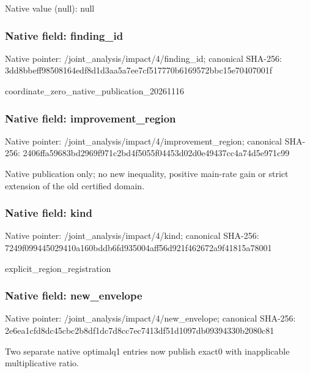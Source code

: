 \documentclass[10pt,a4paper]{article}
\begin{document}
Native value (null): null

\subsubsection{Native field: finding\_\allowbreak{}id}
Native pointer: /joint\_\allowbreak{}analysis/impact/4/finding\_\allowbreak{}id; canonical SHA-256: 3dd8bbeff98508164edf8d1d3aa5a7ee7cf517770b6169572bbc15e70407001f

\begingroup\raggedright\sloppy coordinate\_\allowbreak{}zero\_\allowbreak{}native\_\allowbreak{}publication\_\allowbreak{}20261116\par\endgroup

\subsubsection{Native field: improvement\_\allowbreak{}region}
Native pointer: /joint\_\allowbreak{}analysis/impact/4/improvement\_\allowbreak{}region; canonical SHA-256: 2406ffa59683bd2969f971c2bd4f5055f04453d02d0e49437cc4a74d5e971c99

\begingroup\raggedright\sloppy Native publication only;\allowbreak{} no new inequality,\allowbreak{} positive main-rate gain or strict extension of the old certified domain.\par\endgroup

\subsubsection{Native field: kind}
Native pointer: /joint\_\allowbreak{}analysis/impact/4/kind; canonical SHA-256: 7249f099445029410a160bddb6fd935004aff56d921f462672a9f41815a78001

\begingroup\raggedright\sloppy explicit\_\allowbreak{}region\_\allowbreak{}registration\par\endgroup

\subsubsection{Native field: new\_\allowbreak{}envelope}
Native pointer: /joint\_\allowbreak{}analysis/impact/4/new\_\allowbreak{}envelope; canonical SHA-256: 2e6ea1cfd8dc45cbc2b8df1dc7d8cc7ec7413df51d1097db09394330b2080c81

\begingroup\raggedright\sloppy Two separate native optimalq1 entries now publish exact0 with inapplicable multiplicative ratio.\par\endgroup
\end{document}
